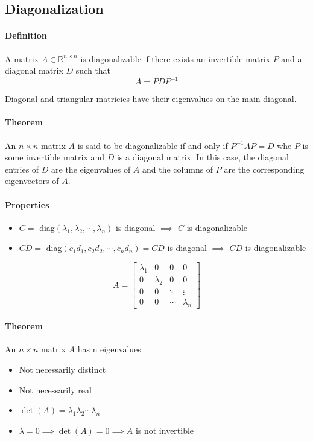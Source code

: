 \subsection{Diagonalization}
\paragraph*{Definition}
A matrix $A \in \mathbb{R}^{n \times n}$ is diagonalizable if there exists an invertible matrix $P$ and a diagonal matrix $D$ such that
\begin{equation*}
    A = PDP^{-1} 
\end{equation*}

Diagonal and triangular matricies have their eigenvalues on the main diagonal.

\paragraph*{Theorem}
An $n \times n$ matrix $A$ is said to be diagonalizable if and only if $P^{-1}AP = D$ whe $P$ is some invertible matrix and $D$ is a diagonal matrix. 
In this case, the diagonal entries of $D$ are the eigenvalues of $A$ and the columns of $P$ are the corresponding eigenvectors of $A$.

\paragraph*{Properties}
\begin{itemize}
    \item $C = $ diag$(\lambda_1, \lambda_2, \cdots, \lambda_n)$ is diagonal $\implies$ $C$ is diagonalizable
    \item $CD = $ diag$(c_1d_1, c_2d_2, \cdots, c_nd_n) = CD$ is diagonal $\implies$ $CD$ is diagonalizable
\end{itemize}

\begin{equation*}
    A = \begin{bmatrix}
        \lambda_1 & 0 & 0 & 0\\
        0 & \lambda_2 & 0 & 0 \\
        0 & 0 & \ddots & \vdots \\
        0 & 0 & \cdots & \lambda_n
    \end{bmatrix}
\end{equation*}

\paragraph*{Theorem}
An $n \times n$ matrix $A$ has n eigenvalues
\begin{itemize}
    \item Not necessarily distinct
    \item Not necessarily real
    \item $\det(A) = \lambda_1 \lambda_2 \cdots \lambda_n$
    \item $\lambda = 0 \implies \det(A) = 0 \implies A$ is not invertible
\end{itemize}

